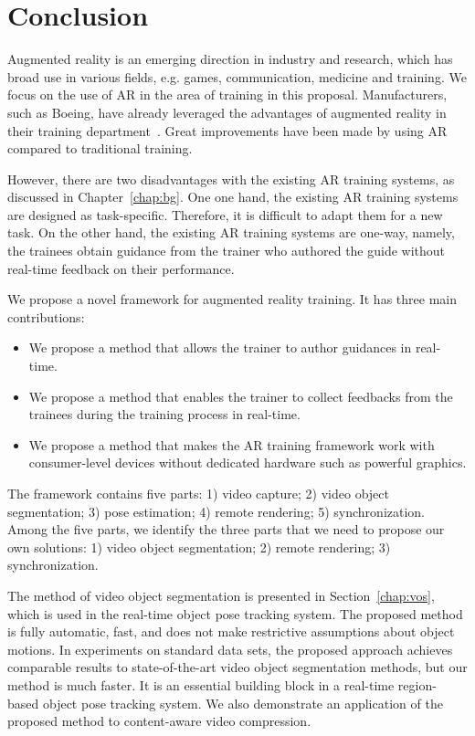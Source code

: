 \chapter{Conclusion}
\label{chap:c}

Augmented reality is an emerging direction in industry and research, which has broad use in various fields, e.g. games, communication, medicine and training. We focus on the use of AR in the area of training in this proposal. Manufacturers, such as Boeing, have already leveraged the advantages of augmented reality in their training department~\cite{caudell1992}. Great improvements have been made by using AR compared to traditional training.

However, there are two disadvantages with the existing AR training systems, as discussed in Chapter~\ref{chap:bg}.
One one hand, the existing AR training systems are designed as task-specific. Therefore, it is difficult to adapt them for a new task.
On the other hand, the existing AR training systems are one-way, namely, the trainees obtain guidance from the trainer who authored the guide without real-time feedback on their performance.

We propose a novel framework for augmented reality training.
It has three main contributions:
\begin{itemize}
  \item
  We propose a method that allows the trainer to author guidances in real-time.
  \item
  We propose a method that enables the trainer to collect feedbacks from the trainees during the training process in real-time.
  \item
  We propose a method that makes the AR training framework work with consumer-level devices without dedicated hardware such as powerful graphics.
\end{itemize}

The framework contains five parts: 1) video capture; 2) video object segmentation; 3) pose estimation; 4) remote rendering; 5) synchronization.
Among the five parts, we identify the three parts that we need to propose our own solutions: 1) video object segmentation; 2) remote rendering; 3) synchronization.

The method of video object segmentation is presented in Section~\ref{chap:vos}, which is used in the real-time object pose tracking system.
The proposed method is fully automatic, fast, and does not make restrictive assumptions about object motions.
In experiments on standard data sets, the proposed approach achieves comparable results to state-of-the-art video object segmentation methods, but our method is much faster.
It is an essential building block in a real-time region-based object pose tracking system.
We also demonstrate an application of the proposed method to content-aware video compression.

